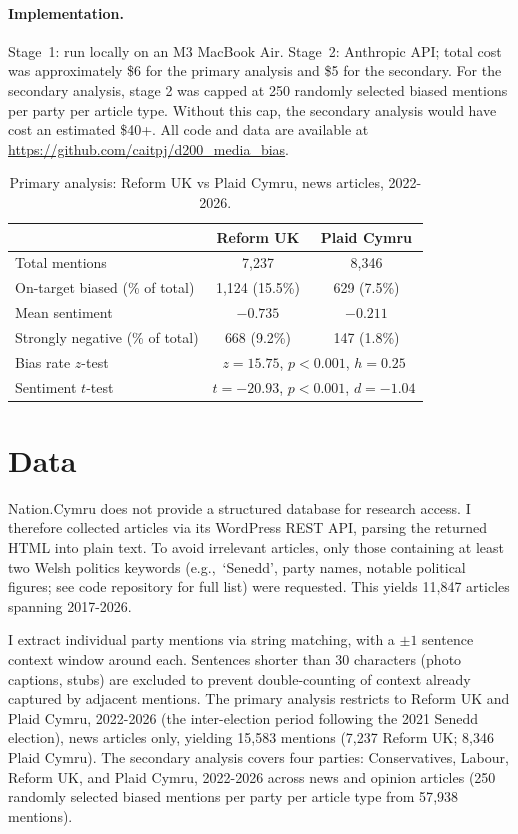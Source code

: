 \documentclass{article}
\begin{document}
\paragraph{Implementation.} Stage~1: run locally on an M3 MacBook Air. Stage~2: Anthropic API; total cost was approximately \$6 for the primary analysis and \$5 for the secondary. For the secondary analysis, stage 2 was capped at 250 randomly selected biased mentions per party per article type. Without this cap, the secondary analysis would have cost an estimated \$40+. All code and data are available at \url{https://github.com/caitpj/d200_media_bias}.

\begin{table}[t]
\caption{Primary analysis: Reform UK vs Plaid Cymru, news articles, 2022-2026.}
\label{tab:primary}
\centering\small
\begin{tabular}{lcc}
\toprule
 & \textbf{Reform UK} & \textbf{Plaid Cymru} \\
\midrule
Total mentions & 7{,}237 & 8{,}346 \\
On-target biased (\% of total) & 1{,}124 (15.5\%) & 629 (7.5\%) \\
Mean sentiment & $-0.735$ & $-0.211$ \\
Strongly negative (\% of total) & 668 (9.2\%) & 147 (1.8\%) \\
\midrule
Bias rate $z$-test & \multicolumn{2}{c}{$z = 15.75$, $p < 0.001$, $h = 0.25$} \\
Sentiment $t$-test & \multicolumn{2}{c}{$t = -20.93$, $p < 0.001$, $d = -1.04$} \\
\bottomrule
\end{tabular}
\end{table}

\section{Data}

Nation.Cymru does not provide a structured database for research access. I therefore collected articles via its WordPress REST API, parsing the returned HTML into plain text. To avoid irrelevant articles, only those containing at least two Welsh politics keywords (e.g.,\ `Senedd', party names, notable political figures; see code repository for full list) were requested. This yields 11{,}847 articles spanning 2017-2026.

I extract individual party mentions via string matching, with a $\pm 1$ sentence context window around each. Sentences shorter than 30 characters (photo captions, stubs) are excluded to prevent double-counting of context already captured by adjacent mentions. The primary analysis restricts to Reform UK and Plaid Cymru, 2022-2026 (the inter-election period following the 2021 Senedd election), news articles only, yielding 15{,}583 mentions (7{,}237 Reform UK; 8{,}346 Plaid Cymru). The secondary analysis covers four parties: Conservatives, Labour, Reform UK, and Plaid Cymru, 2022-2026 across news and opinion articles (250 randomly selected biased mentions per party per article type from 57{,}938 mentions).
\end{document}
